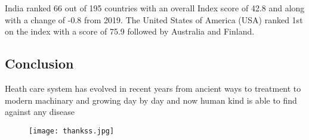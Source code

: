 \documentclass[12pt]{report}
\begin{document}
India ranked 66 out of 195 countries with an overall Index score of 42.8 and along with a change of -0.8 from 2019. The United States of America (USA) ranked 1st on the index with a score of 75.9 followed by Australia and Finland.

\subsection{Conclusion}
 Heath care system has evolved in recent years from 
 ancient ways to treatment to modern machinary and   
 growing day by day and now human kind is able to find  
 against any disease 
 \clearpage
 
 \begin{figure}
\centering
\texttt{[image: thankss.jpg]}
\end{figure}
 
 
\end{document}
